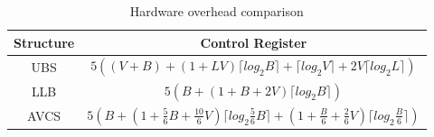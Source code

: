 \documentclass[10pt,conference]{IEEEtran}
\begin{document}

\begin{table}
\caption{Hardware overhead comparison}\label{control}
\centering\begin{tabular}{c|c}
\hline
\hline
Structure & Control Register\\
\hline
UBS \cite{NPKV06}  &   $5((V+B)+(1+LV)\lceil log_2B\rceil+\lceil log_2V\rceil+2V\lceil log_2L\rceil)$\\
\hline
LLB \cite{4555894} & $5(B+(1+B+2V) \lceil log_2B\rceil)$\\
\hline
AVCS    & $5(B+(1+\frac{5}{6}B+\frac{10}{6}V)\lceil log_2\frac{5}{6}B\rceil +(1+\frac{B}{6}+\frac{2}{6}V)\lceil log_2\frac{B}{6}\rceil)$\\
\hline
\end{tabular}
\end{table}
\end{document}

